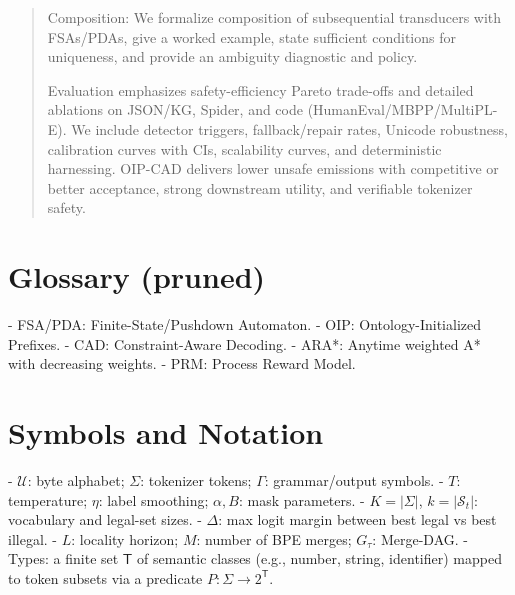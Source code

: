 \documentclass{article}
\begin{document}
\begin{abstract}
Composition: We formalize composition of subsequential transducers with FSAs/PDAs, give a worked example, state sufficient conditions for uniqueness, and provide an ambiguity diagnostic and policy.

Evaluation emphasizes safety-efficiency Pareto trade-offs and detailed ablations on JSON/KG, Spider, and code (HumanEval/MBPP/MultiPL-E). We include detector triggers, fallback/repair rates, Unicode robustness, calibration curves with CIs, scalability curves, and deterministic harnessing. OIP-CAD delivers lower unsafe emissions with competitive or better acceptance, strong downstream utility, and verifiable tokenizer safety.
\end{abstract}

\section*{Glossary (pruned)}
- FSA/PDA: Finite-State/Pushdown Automaton.
- OIP: Ontology-Initialized Prefixes.
- CAD: Constraint-Aware Decoding.
- ARA*: Anytime weighted A* with decreasing weights.
- PRM: Process Reward Model.

\section*{Symbols and Notation}
- $\mathcal{U}$: byte alphabet; $\Sigma$: tokenizer tokens; $\Gamma$: grammar/output symbols.
- $T$: temperature; $\eta$: label smoothing; $\alpha,B$: mask parameters.
- $K=|\Sigma|$, $k=|\mathcal{S}_t|$: vocabulary and legal-set sizes.
- $\Delta$: max logit margin between best legal vs best illegal.
- $L$: locality horizon; $M$: number of BPE merges; $G_\tau$: Merge-DAG.
- Types: a finite set $\mathsf{T}$ of semantic classes (e.g., number, string, identifier) mapped to token subsets via a predicate $P:\Sigma\to 2^{\mathsf{T}}$.
\end{document}
